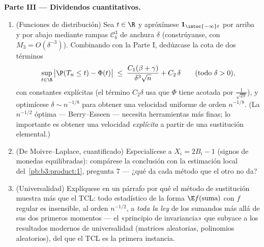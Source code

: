 \begin{problem}
\medskip
\noindent\textbf{Parte III --- Dividendos cuantitativos.}
\begin{enumerate}[resume]
  \item (Funciones de distribución) Sea $t \in \R$ y apróxímese
  $\mathbf 1_{\intoc{-\infty}t}$ por arriba y por abajo mediante rampas
  $\mathcal C^3_b$ de anchura $\delta$ (constrúyanse, con
  $M_3 = O(\delta^{-3})$). Combinando con la Parte I, dedúzcase la cota
  de dos términos
        \[
        \sup_{t\in\R}\,\bigl|\P(T_n \leq t) -
        \Phi(t)\bigr| \;\leq\;
        \frac{C_1(\beta + \gamma)}{\delta^3\sqrt n} +
        C_2\,\delta
        \qquad (\text{todo } \delta > 0),
        \]
        con constantes explícitas (el término $C_2\delta$ usa que $\Phi$
        tiene  acotada por
        $\frac1{\sqrt{2\pi}}$), y optimícese $\delta \sim
        n^{-1/8}$ para obtener una velocidad uniforme de orden
        $n^{-1/8}$.
        (La $n^{-1/2}$ óptima --- Berry--Esseen --- necesita
        herramientas más finas; lo importante es obtener una velocidad
        \emph{explícita} a partir de una sustitución elemental.) \item
        (De Moivre--Laplace, cuantificado) Especialícese a
        $X_i = 2B_i - 1$ (signos de monedas equilibradas): compárese la
        conclusión con la estimación local del~\cref{pb:b3:product:1},
        pregunta 7 --- ¿qué da cada método que el otro no da? \item
        (Universalidad) Explíquese en un párrafo por qué el método de
        sustitución muestra más que el TCL: todo estadístico de la forma
        $\E f(\text{suma})$ con $f$ regular es insensible, al orden
        $n^{-1/2}$, a \emph{toda la ley} de los sumandos más allá de sus
        dos primeros momentos --- el «principio de invariancia» que
        subyace a los resultados modernos de universalidad (matrices
        aleatorias, polinomios aleatorios), del que el TCL es la primera
        instancia.
\end{enumerate}


\end{problem}
